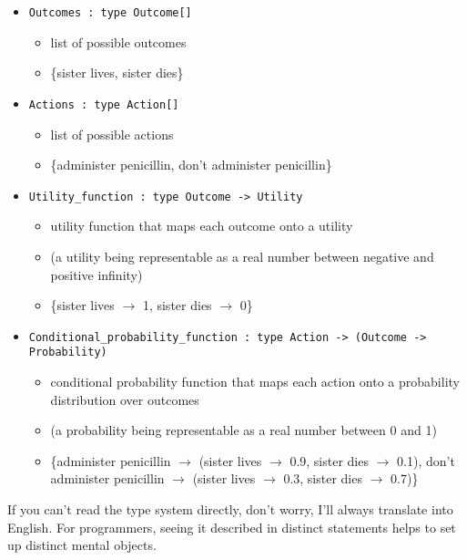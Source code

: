 \begin{itemize}
\item  \texttt{Outcomes : type Outcome[]}
  \begin{itemize}
    \item list of possible outcomes
    \item \{sister lives, sister dies\}
  \end{itemize}

\item \texttt{Actions : type Action[]}
  \begin{itemize}
    \item list of possible actions
    \item \{administer penicillin, don't administer penicillin\}
  \end{itemize}

\item \texttt{Utility\_function : type Outcome -{\textgreater} Utility}
  \begin{itemize}
    \item utility
      function that maps each outcome onto a utility
    \item (a utility being
      representable as a real number between negative and positive infinity)
    \item \{sister lives $\rightarrow $ 1,
      sister dies $\rightarrow $ 0\}
  \end{itemize}

\item \texttt{Conditional\_probability\_function :\newline
  type Action -{\textgreater} (Outcome -{\textgreater} Probability)}
  \begin{itemize}
    \item conditional probability function that maps each action onto a
      probability distribution over outcomes
    \item (a probability being
      representable as a real number between 0 and 1)
    \item \{administer penicillin $\rightarrow
$ (sister lives $\rightarrow $ 0.9, sister dies $\rightarrow $ 0.1),
don't administer penicillin $\rightarrow $ (sister
lives $\rightarrow $ 0.3, sister dies $\rightarrow $
0.7)\}
  \end{itemize}
\end{itemize}


 If you can't read the type system directly,
don't worry, I'll always translate into
English. For programmers, seeing it described in distinct statements
helps to set up distinct mental objects.


